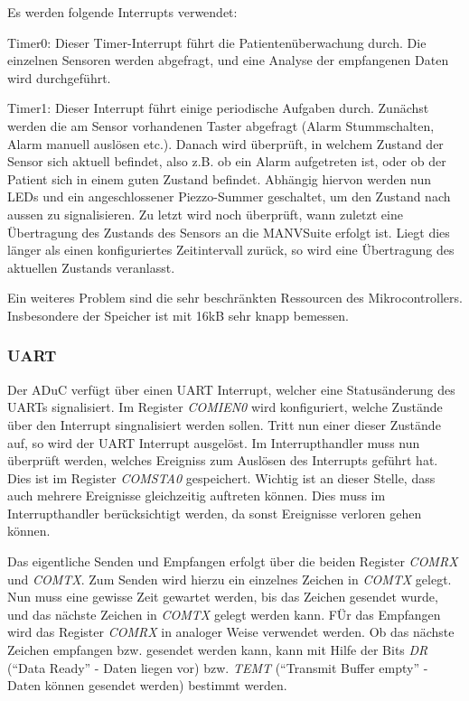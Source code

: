 Es werden folgende Interrupts verwendet:

Timer0: Dieser Timer-Interrupt führt die Patientenüberwachung durch. Die einzelnen Sensoren werden abgefragt,
und eine Analyse der empfangenen Daten wird durchgeführt.

Timer1: Dieser Interrupt führt einige periodische Aufgaben durch. Zunächst werden die am Sensor vorhandenen
Taster abgefragt (Alarm Stummschalten, Alarm manuell auslösen etc.). Danach wird überprüft, in welchem Zustand
der Sensor sich aktuell befindet, also z.B. ob ein Alarm aufgetreten ist, oder ob der Patient sich in einem
guten Zustand befindet. Abhängig hiervon werden nun LEDs und ein angeschlossener Piezzo-Summer geschaltet,
um den Zustand nach aussen zu signalisieren. Zu letzt wird noch überprüft, wann zuletzt eine Übertragung
des Zustands des Sensors an die MANVSuite erfolgt ist. Liegt dies länger als einen konfiguriertes Zeitintervall
zurück, so wird eine Übertragung des aktuellen Zustands veranlasst.

Ein weiteres Problem sind die sehr beschränkten Ressourcen des Mikrocontrollers. Insbesondere der Speicher ist
mit 16kB sehr knapp bemessen. 

\subsubsection{UART}
Der ADuC verfügt über einen UART Interrupt, welcher eine Statusänderung des UARTs signalisiert. Im Register 
\textsl{COMIEN0} wird konfiguriert, welche Zustände über den Interrupt singnalisiert werden sollen. Tritt
nun einer dieser Zustände auf, so wird der UART Interrupt ausgelöst. Im Interrupthandler muss nun überprüft
werden, welches Ereigniss zum Auslösen des Interrupts geführt hat. Dies ist im Register \textsl{COMSTA0} 
gespeichert. Wichtig ist an dieser Stelle, dass auch mehrere Ereignisse gleichzeitig auftreten können. 
Dies muss im Interrupthandler berücksichtigt werden, da sonst Ereignisse verloren gehen können.

Das eigentliche Senden und Empfangen erfolgt über die beiden Register \textsl{COMRX} und \textsl{COMTX}.
Zum Senden wird hierzu ein einzelnes Zeichen in \textsl{COMTX} gelegt. Nun muss eine gewisse Zeit gewartet
werden, bis das Zeichen gesendet wurde, und das nächste Zeichen in \textsl{COMTX} gelegt werden kann.
FÜr das Empfangen wird das Register \textsl{COMRX} in analoger Weise verwendet werden. Ob das nächste
Zeichen empfangen bzw. gesendet werden kann, kann mit Hilfe der Bits \textsl{DR} ("`Data Ready"' - Daten liegen vor)
bzw. \textsl{TEMT} ("`Transmit Buffer empty"' - Daten können gesendet werden) bestimmt werden.

